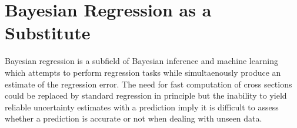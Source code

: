 \begin{comment}
\begin{itemize}
    \item $n_i$: Målte events (kollisjoner) som oppfyller et sett (kalt signalregion) med kriterier (``cuts'').
    \item $b_i$: Bakgrunnen. Estimert SM bidrag for samme signal region.
    \item $s_i$: BSM estimert bidrag for signalregionen med et sett med parameterverdier for en ny BSM modell (i.e SUSY). Den er regnet ut ved 
    \begin{equation}
        s_i = \sigma \epsilon_i A_i \mathcal{L},
    \end{equation}
    der $\sigma$ er tverrsnittet som måler sannsynligheten for at en ``ny'' prosess skjer, $\epsilon_i$ er detektor effektivitet, $A_i$ er akseptans 
    og $\mathcal{L}$ er integrert luminositet over data brukt i søket. 
    \item Statistisk analyse gjøres med å regne ut Poisson likelihood 
    \begin{equation}
        \mathcal{L}(s, b, n) = \frac{e^{-(s + b)}(s + b)^n}{n!}.
    \end{equation} 
    og en test statistikk
    \begin{equation}
        q = -2\ln \frac{\mathcal{L}(s, b, n)}{\mathcal{L}(s=0, b, n)}.
    \end{equation}
\end{itemize}
\end{comment}

\section{Bayesian Regression as a Substitute}
Bayesian regression is a subfield of Bayesian inference and machine learning which attempts to perform regression tasks while simultaenously produce an estimate of the regression error. The need for fast computation of cross sections could be replaced by standard regression in principle but the inability to yield reliable uncertainty estimates with a prediction imply it is difficult to assess whether a prediction is accurate or not when dealing with unseen data. 




